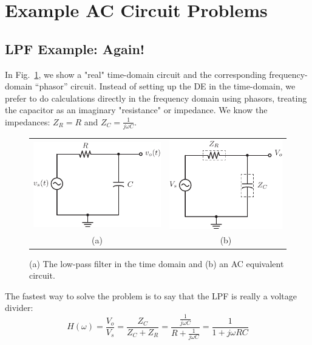 \section{Example AC Circuit Problems}
\subsection{LPF Example: Again!}
In Fig.~\ref{fig:lpfagain}, we show a "real"  time-domain circuit and the corresponding frequency-domain “phasor” circuit.   Instead of setting up the DE in the time-domain, we prefer to do calculations directly in the frequency domain using phasors, treating the capacitor as an imaginary "resistance" or impedance.  We know the impedances: ${Z_R} = R $ and $ {Z_C} = \frac{1}{{j\omega C}}$.
\begin{figure}[tb]
\centering
\begin{tabular}{cc}
\includegraphics[angle=-0.0,scale=1]{mod1_3_5_rc_lpf} &
\includegraphics[angle=-0.0,scale=1]{mod1_3_6_rc_lpf_Z}\\
(a) & (b)\\
\end{tabular}
\caption{(a) The low-pass filter in the time domain and (b) an AC equivalent circuit.}
\label{fig:lpfagain}
\end{figure}
The fastest way to solve the problem is to say that the LPF is really a voltage divider:
    \begin{equation}
        H(\omega ) = \frac{{{V_o}}}{{{V_s}}} = \frac{{{Z_C}}}{{{Z_C} + {Z_R}}} = \frac{{\frac{1}{{j\omega C}}}}{{R + \frac{1}{{j\omega C}}}} = \frac{1}{{1 + j\omega RC}}
    \end{equation}

